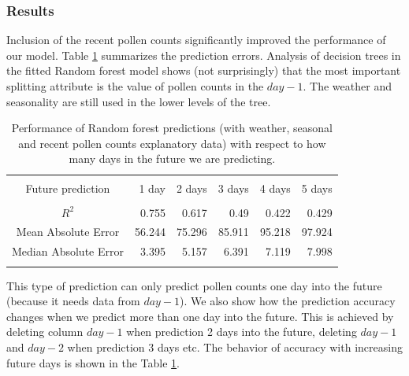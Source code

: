 \documentclass[a4paper,11pt]{article}
\begin{document}
\subsubsection*{Results}
Inclusion of the recent pollen counts significantly improved the performance of our model. Table \ref{tab:future} summarizes the prediction errors. Analysis of decision trees in the fitted Random forest model shows (not surprisingly) that the most important splitting attribute is the value of pollen counts in the $day - 1$. The weather and seasonality are still used in the lower levels of the tree.

\begin{table}
	\centering
	\begin{tabular}{crrrrr}
		\hline \\
		\vspace{0.6em}
		Future prediction & 1 day & 2 days & 3 days  & 4 days & 5 days  \\
		\hline \\
		\vspace{0.2em}
		$R^2$ & 0.755 & 0.617 & 0.49  & 0.422 & 0.429 \\ 
		\vspace{0.2em}
		Mean Absolute Error & 56.244 & 75.296 & 85.911  & 95.218 & 97.924\\
		\vspace{0.2em}
		Median Absolute Error & 3.395  & 5.157 & 6.391  & 7.119& 7.998  \\ \vspace{-0.4em} \\
		\hline
	\end{tabular}
	\caption{Performance of Random forest predictions (with weather, seasonal and recent pollen counts explanatory data) with respect to how many days in the future we are predicting.}
	\label{tab:future}
\end{table}

\noindent
This type of prediction can only predict pollen counts one day into the future (because it needs data from $day-1$). We also show how the prediction accuracy changes when we predict more than one day into the future. This is achieved by deleting column $day-1$ when prediction 2 days into the future, deleting $day-1$ and $day-2$ when prediction 3 days etc. The behavior of accuracy with increasing future days is shown in the Table \ref{tab:future}.
\end{document}
